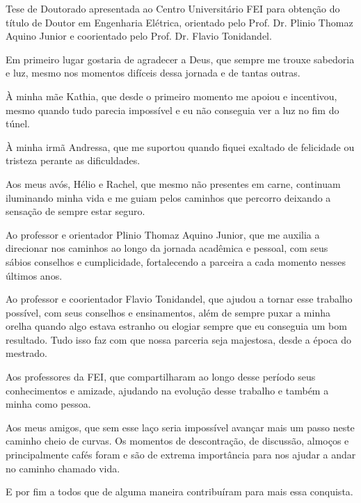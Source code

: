 \maketitle{}

\begin{folhaderosto}
Tese de Doutorado apresentada ao Centro Universitário FEI para obtenção do título de Doutor em Engenharia Elétrica, orientado pelo Prof. Dr. Plinio Thomaz Aquino Junior e coorientado pelo Prof. Dr. Flavio Tonidandel.
\end{folhaderosto}




\begin{agradecimentos}
Em primeiro lugar gostaria de agradecer a Deus, que sempre me trouxe sabedoria e luz, mesmo nos momentos difíceis dessa jornada e de tantas outras.

À minha mãe Kathia, que desde o primeiro momento me apoiou e incentivou, mesmo quando tudo parecia impossível e eu não conseguia ver a luz no fim do túnel.

À minha irmã Andressa, que me suportou quando fiquei exaltado de felicidade ou tristeza perante as dificuldades.

Aos meus avós, Hélio e Rachel, que mesmo não presentes em carne, continuam iluminando minha vida e me guiam pelos caminhos que percorro deixando a sensação de sempre estar seguro.

Ao professor e orientador Plinio Thomaz Aquino Junior, que me auxilia a direcionar nos caminhos ao longo da jornada acadêmica e pessoal, com seus sábios conselhos e cumplicidade, fortalecendo a parceira a cada momento nesses últimos anos.

Ao professor e coorientador Flavio Tonidandel, que ajudou a tornar esse trabalho possível, com seus conselhos e ensinamentos, além de sempre puxar a minha orelha quando algo estava estranho ou elogiar sempre que eu conseguia um bom resultado. Tudo isso faz com que nossa parceria seja majestosa, desde a época do mestrado.

Aos professores da FEI, que compartilharam ao longo desse período seus conhecimentos e amizade, ajudando na evolução desse trabalho e também a minha como pessoa.

Aos meus amigos, que sem esse laço seria impossível avançar mais um passo neste caminho cheio de curvas. Os momentos de descontração, de discussão, almoços e principalmente cafés foram e são de extrema importância para nos ajudar a andar no caminho chamado vida.

E por fim a todos que de alguma maneira contribuíram para mais essa conquista.

\end{agradecimentos}

